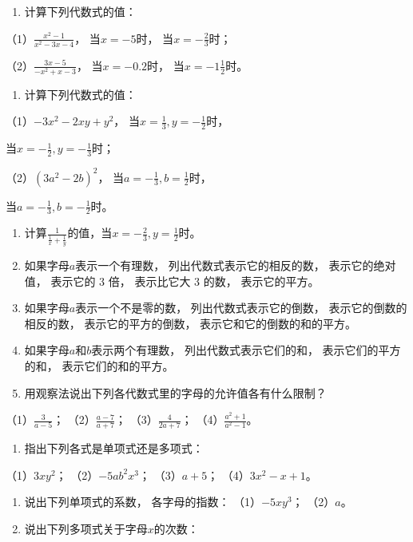 \begin{enumerate}[start=6]
\item
  计算下列代数式的值：
\end{enumerate}

（1）\(\frac{x^2 - 1}{x^2 - 3x - 4}\)， 当\(x = -5\)时，
当\(x = -\frac{2}{3}\)时；

（2）\(\frac{3x - 5}{-x^2 + x - 3}\)， 当\(x = -0.2\)时，
当\(x = -1\frac{1}{2}\)时。

\begin{enumerate}[start=7]
\item
  计算下列代数式的值：
\end{enumerate}

（1）\(-3x^{2} - 2xy + y^{2}\)，
当\(x = \frac{1}{3}, y = -\frac{1}{2}\)时，

当\(x = -\frac{1}{2}, y = -\frac{1}{3}\)时；

（2）\((3a^{2} - 2b)^{2}\)， 当\(a = -\frac{1}{3}, b = \frac{1}{2}\)时，

当\(a = -\frac{1}{3}, b = -\frac{1}{2}\)时。

\begin{enumerate}[start=8]
\item
  计算\(\frac{1}{\frac{1}{x} + \frac{1}{y}}\)的值，当\(x = -\frac{2}{3}, y = \frac{1}{2}\)时。
\item
  如果字母\(a\)表示一个有理数， 列出代数式表示它的相反的数，
  表示它的绝对值， 表示它的 3 倍， 表示比它大 3 的数， 表示它的平方。
\item
  如果字母\(a\)表示一个不是零的数， 列出代数式表示它的倒数，
  表示它的倒数的相反的数， 表示它的平方的倒数，
  表示它和它的倒数的和的平方。
\item
  如果字母\(a\)和\(b\)表示两个有理数， 列出代数式表示它们的和，
  表示它们的平方的和， 表示它们的和的平方。
\item
  用观察法说出下列各代数式里的字母的允许值各有什么限制？
\end{enumerate}

（1）\(\frac{3}{a - 5}\)； （2）\(\frac{a - 7}{a + 7}\)；
（3）\(\frac{4}{2a + 7}\)； （4）\(\frac{a^2 + 1}{a^2 - 1}\)。

\begin{enumerate}[start=13]
\item
  指出下列各式是单项式还是多项式：
\end{enumerate}

（1）\(3xy^{2}\)； （2）\(-5ab^{2}x^{3}\)； （3）\(a + 5\)；
（4）\(3x^{2} - x + 1\)。

\begin{enumerate}[start=14]
\item
  说出下列单项式的系数， 各字母的指数： （1）\(-5xy^{3}\)； （2）\(a\)。
\item
  说出下列多项式关于字母\(x\)的次数：
\end{enumerate}

